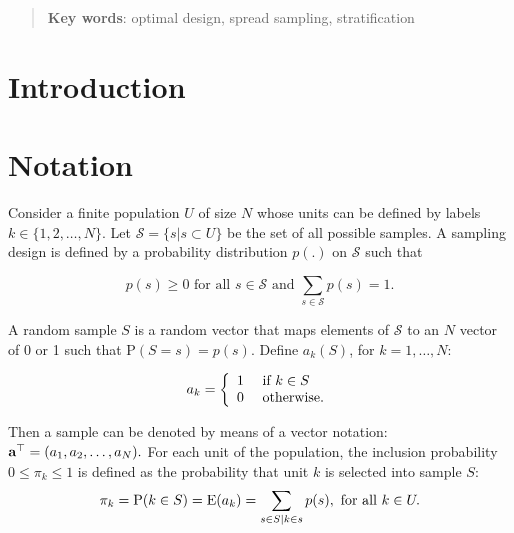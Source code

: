 \documentclass[12pt,english]{article}\usepackage[]{graphicx}\usepackage{xcolor}
\begin{document}
\maketitle




\begin{abstract}


\textbf{Key words}: optimal design, spread sampling, stratification
\end{abstract}
\newpage


\section{Introduction}


\section{Notation}


Consider a finite population $U$ of size $N$ whose units can be defined by labels $k\in\{1,2,\dots,N\}$. Let $\mathcal{S} = \{s | s\subset U\}$ be the set of all possible samples. A sampling design is defined by a probability distribution $p(.)$ on $\mathcal{S}$ such that

$$
p(s) \geq 0 \text{ for all } s\in \mathcal{S} \text{ and }\sum_{ s\in \mathcal{S}}p(s) = 1.
$$

A random sample $S$ is a random vector that maps elements of $\mathcal{S}$ to an $N$ vector of 0 or 1 such that $\textrm{P}(S = s) =
p(s)$. Define $a_k(S)$, for $k = 1,\dots,N$:

$$
a_k =
\left\{\begin{array}{lll} 1 & \text{ if } k\in S\\ 0 & \text{ otherwise} . \end{array} \right.
$$

Then a sample can be denoted by means of a vector notation:
$
 \textbf{a}^\top = (a_1,a_2,\dots,a_N).
$ For each unit of the population, the inclusion probability $0\leq\pi_k\leq 1$ is defined as the probability that unit $k$ is selected into sample $S$:
\begin{equation*}\label{eq:pik}
 \pi_k = \textrm{P}(k \in S) = \textrm{E}(a_k) =  \sum_{s\in S | k \in s} p(s), \text{ for all } k\in U.
\end{equation*}
\end{document}
